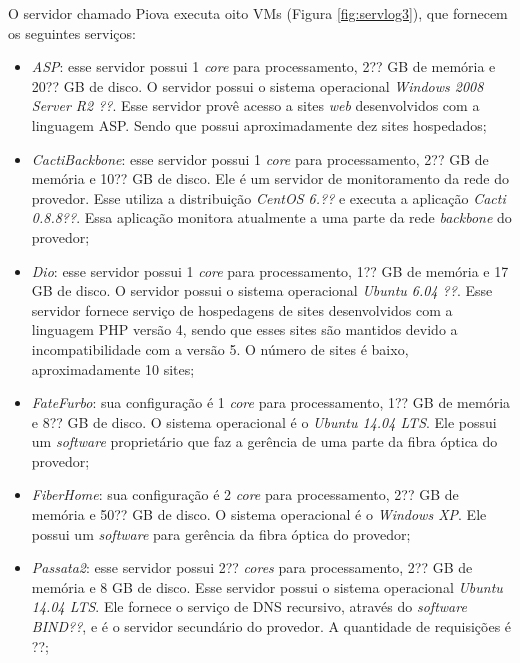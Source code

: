 O servidor chamado Piova executa oito \ac{VM}s (Figura \ref{fig:servlog3}), que fornecem os seguintes serviços:
\begin{itemize}
 \item \textit{ASP}: esse servidor possui 1 \textit{core} para processamento, 2?? GB de memória e 20?? GB de disco. O servidor possui o sistema 
 operacional \textit{Windows 2008 Server R2 ??}. Esse servidor provê acesso a sites \textit{web} desenvolvidos com a linguagem \ac{ASP}.
 Sendo que possui aproximadamente dez sites hospedados;
 
 \item \textit{CactiBackbone}: esse servidor possui 1 \textit{core} para processamento, 2?? GB de memória e 10?? GB de disco. Ele é um servidor
 de monitoramento da rede do provedor. Esse utiliza a distribuição \textit{CentOS 6.??} e executa a aplicação \textit{Cacti 0.8.8??}. 
 Essa aplicação monitora atualmente a uma parte da rede \textit{backbone} do provedor;
 
 \item \textit{Dio}: esse servidor possui 1 \textit{core} para processamento, 1?? GB de memória e 17 GB de disco. O servidor possui o sistema 
 operacional \textit{Ubuntu 6.04 ??}. Esse servidor fornece serviço de hospedagens de sites desenvolvidos com a linguagem \ac{PHP} versão 4, 
 sendo que esses sites são mantidos devido a incompatibilidade com a versão 5. O número de sites é baixo, aproximadamente 10 sites;
 
 \item \textit{FateFurbo}: sua configuração é 1 \textit{core} para processamento, 1?? GB de memória e 8?? GB de disco. O sistema operacional é o 
 \textit{Ubuntu 14.04 \ac{LTS}}. Ele possui um \textit{software} proprietário que faz a gerência de uma parte da fibra óptica do provedor;
 
 \item \textit{FiberHome}: sua configuração é 2 \textit{core} para processamento, 2?? GB de memória e 50?? GB de disco. O sistema operacional é o 
 \textit{Windows XP}. Ele possui um \textit{software} para gerência da fibra óptica do provedor;
 
 \item \textit{Passata2}: esse servidor possui 2?? \textit{cores} para processamento, 2?? GB de memória e 8 GB de disco. Esse servidor possui o 
 sistema operacional \textit{Ubuntu 14.04 \ac{LTS}}. Ele fornece o serviço de \ac{DNS} recursivo, através do \textit{software} \textit{BIND??}, 
 e é o servidor secundário do provedor. A quantidade de requisições é ??;
 

\end{itemize}
